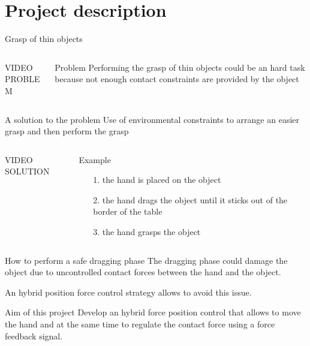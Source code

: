\section{Project description}
\begin{frame}{Grasp of thin objects}
  \begin{columns}
    \begin{column}{0.5\textwidth}
      VIDEO PROBLEM
    \end{column}
    \begin{column}{0.5\textwidth}
      \begin{alertblock}{Problem}
        Performing the grasp of thin objects could be an hard task
        because not enough contact constraints are provided by the object
      \end{alertblock}
    \end{column}
  \end{columns}
\end{frame}

\begin{frame}{A solution to the problem}
  Use of environmental constraints to arrange an easier grasp and
  then perform the grasp
  \begin{columns}
    \begin{column}{0.5\textwidth}
      VIDEO SOLUTION
    \end{column}
    \begin{column}{0.5\textwidth}
      \begin{exampleblock}{Example}
        \begin{itemize}
        \item[1.] the hand is placed on the object
        \item[2.] the hand drags the object until it \alert{sticks out 
          of the border} of the table 
        \item[3.] the hand grasps the object
        \end{itemize}
      \end{exampleblock}
    \end{column}
  \end{columns}
\end{frame}

\begin{frame}{How to perform a safe dragging phase}
  The dragging phase could \alert{damage} the object due to uncontrolled contact forces between the 
  hand and the object.
  \par
  An hybrid position force control strategy allows to avoid this issue.
  \vskip0.5in
  \begin{exampleblock}{Aim of this project}
    Develop an hybrid force position control that allows to move the hand and 
    at the same time to regulate the contact force using a force feedback signal.
  \end{exampleblock}
\end{frame}
